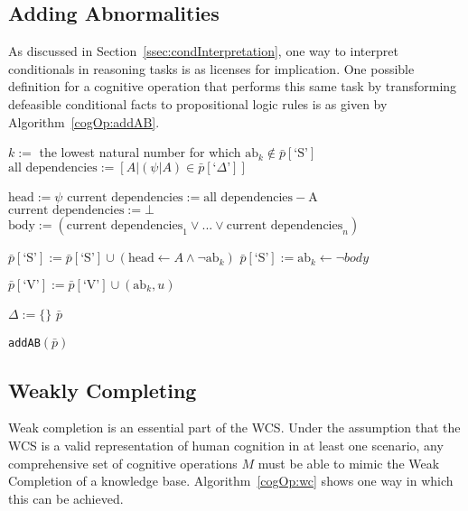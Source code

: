 \subsection{Adding Abnormalities}

As discussed in Section~\ref{ssec:condInterpretation}, one way to interpret conditionals in reasoning tasks is as licenses for implication. One possible definition for a cognitive operation that performs this same task by transforming defeasible conditional facts to propositional logic rules is as given by Algorithm~\ref{cogOp:addAB}.
\newpage
\begin{algorithm}[H]
\SetAlgoLined
{}
{
{
$k:=$ the lowest natural number for which $\text{ab}_k \notin \bar{p}[\textrm{`S'}]$\;
$\text{all dependencies}:= [A | (\psi|A) \in \bar{p}[\textrm{`}\Delta\textrm{'}]]$\;

{
$\text{head}:=\psi$\;
$\text{current dependencies}:= \text{all dependencies} - \text{A}$\;
{
$\text{current dependencies}:=\bot$\;
}
$\text{body}:=(\text{current dependencies}_1 \lor ... \lor \text{current dependencies}_n)$\;

$\bar{p}[\textrm{`S'}]:= \bar{p}[\textrm{`S'}] \cup (\text{head} \leftarrow A \land \lnot \text{ab}_k)$\;
$\bar{p}[\textrm{`S'}]:= \text{ab}_k \leftarrow \lnot body$\;

}
$\bar{p}[\textrm{`V'}]:= \bar{p}[\textrm{`V'}] \cup (\text{ab}_k,u)$\;
}
$\Delta:=\{\}$\;
\Return $\bar{p}$
}
\caption{\texttt{addAB}$(\bar{p})$}
 \label{cogOp:addAB}
\end{algorithm}

\subsection{Weakly Completing}


Weak completion is an essential part of the WCS. Under the assumption that the WCS is a valid representation of human cognition in at least one scenario, any comprehensive set of cognitive operations $M$ must be able to mimic the Weak Completion of a knowledge base. Algorithm~\ref{cogOp:wc} shows one way in which this can be achieved.

